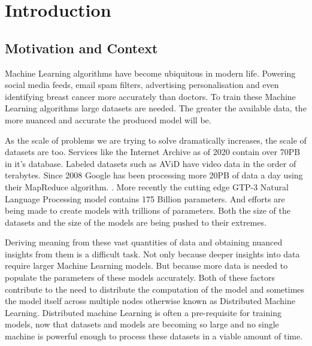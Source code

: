
\section{Introduction}

\subsection{Motivation and Context}

Machine Learning algorithms have become ubiquitous in modern life. Powering
social media feeds, email spam filters, advertising personalisation and even
identifying breast cancer more accurately than doctors. \cite{Mammograms2020} To
train these Machine Learning algorithms large datasets are needed. The greater
the available data, the more nuanced and accurate the produced model will be.
\par

As the scale of problems we are trying to solve dramatically increases, the
scale of datasets are too. Services like the Internet Archive as of 2020 contain
over 70PB in it's database. Labeled datasets such as AViD have video data in the
order of terabytes. \cite{piergiovanni2020avid} Since 2008 Google has been
processing more 20PB of data a day using their MapReduce algorithm.
\cite{googlemapreduce2008}. More recently the cutting edge GTP-3 Natural
Language Processing model contains 175 Billion parameters.
\cite{fewshowlearners2020gpt} And efforts are being made to create models with
trillions of parameters. \cite{rajbhandari2020zero} Both the size of the
datasets and the size of the models are being pushed to their extremes.
\par

Deriving meaning from these vast quantities of data and obtaining nuanced
insights from them is a difficult task. Not only because deeper insights into
data require larger Machine Learning models. But because more data is needed to
populate the parameters of these models accurately. Both of these factors
contribute to the need to distribute the computation of the model and sometimes
the model itself across multiple nodes otherwise known as Distributed Machine
Learning. Distributed machine Learning is often a pre-requisite for training
models, now that datasets and models are becoming so large and no single machine
is powerful enough to process these datasets in a viable amount of time.
\cite{LI2014ParameterServers}
\par

